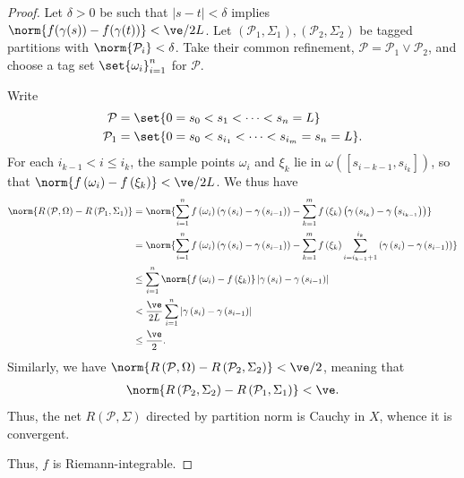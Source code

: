 \documentclass[10pt]{mypackage}
\begin{document}
\begin{proof}
  Let $\delta > 0$ be such that $\left\vert s-t \right\vert < \delta$ implies $\norm{f(\gamma(s)) - f(\gamma(t))} < \ve/2L$. Let $\left( \mathcal{P}_1,\Sigma_1 \right),\left( \mathcal{P}_2,\Sigma_2 \right)$ be tagged partitions with $\norm{\mathcal{P}_i} < \delta$. Take their common refinement, $\mathcal{P} = \mathcal{P}_1\vee \mathcal{P}_2$, and choose a tag set $\set{\omega_i}_{i=1}^{n}$ for $\mathcal{P}$.

  Write
  \begin{align*}
    \mathcal{P} &= \set{0 = s_0 < s_1 < \cdots < s_n = L}\\
    \mathcal{P}_1 &= \set{0 = s_0 < s_{i_1} < \cdots < s_{i_m} = s_n = L}.
  \end{align*}
  For each $i_{k-1} < i \leq i_k$, the sample points $\omega_i$ and $\xi_k$ lie in $\omega\left( \left[ s_{i-{k-1}},s_{i_k} \right] \right)$, so that $\norm{f\left( \omega_i \right) - f\left( \xi_k \right)} < \ve/2L$. We thus have
  \begin{align*}
    \norm{R\left( \mathcal{P},\Omega \right) - R\left( \mathcal{P}_1,\Sigma_1 \right)} &= \norm{\sum_{i=1}^{n}f\left( \omega_i \right)\left( \gamma\left( s_i \right) - \gamma\left( s_{i-1} \right) \right) - \sum_{k=1}^{m} f\left( \xi_k \right)\left( \gamma\left( s_{i_k} \right) - \gamma\left( s_{i_{k-1}} \right) \right)}\\
                                                                                       &= \norm{\sum_{i=1}^{n}f\left( \omega_i \right)\left( \gamma\left( s_i \right) - \gamma\left( s_{i-1} \right) \right) - \sum_{k=1}^{m}f\left( \xi_k \right)\sum_{i=i_{k-1}+1}^{i_k}\left( \gamma\left( s_i \right) - \gamma\left( s_{i-1} \right) \right)}\\
                                                                                       &\leq \sum_{i=1}^{n} \norm{f\left( \omega_i \right) - f\left( \xi_k \right)} \left\vert \gamma\left( s_i \right) - \gamma\left( s_{i-1} \right) \right\vert\\
                                                                                       &< \frac{\ve}{2L}\sum_{i=1}^{n} \left\vert \gamma\left( s_i \right) - \gamma\left( s_{i-1} \right) \right\vert\\
                                                                                       &\leq \frac{\ve}{2}.
  \end{align*}
  Similarly, we have $\norm{R\left( \mathcal{P},\Omega \right)-R\left( \mathcal{P}_2,\Sigma_2 \right)} < \ve/2$, meaning that
  \begin{align*}
    \norm{R\left( \mathcal{P}_2,\Sigma_2 \right)- R\left( \mathcal{P}_1,\Sigma_1 \right)} < \ve.
  \end{align*}
  Thus, the net $R\left( \mathcal{P},\Sigma \right)$ directed by partition norm is Cauchy in $X$, whence it is convergent.

  Thus, $f$ is Riemann-integrable.
\end{proof}
\end{document}
